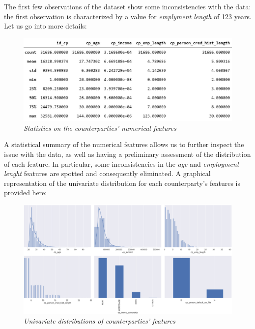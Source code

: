 \documentclass[a4paper,12pt]{article}
\begin{document}
    The first few observations of the dataset show some inconsistencies with the data: the first observation 
    is characterized by a value for \textit{emplyment length} of 123 years. Let us go into more details:

        \begin{figure}[H]
            \centerline{
                \includegraphics[width=\linewidth]{./images/cp_dataset_describe.jpg}
            }
            \caption{\textit{Statistics on the counterparties' numerical features}}
            \label{fig:cp_describe}
        \end{figure}

    A statistical summary of the numerical features allows us to further inspect the issue with the data, as well
    as having a preliminary assessment of the distribution of each feature. In particular, some inconsistencies 
    in the \textit{age} and \textit{employment lenght} features are spotted and consequently eliminated. 
    A graphical representation of the univariate distribution for each counterparty's features is provided here:

        \begin{figure}[H]
            \centerline{
                \includegraphics[width=\linewidth]{./images/cp_univariate.png}
            }
            \caption{\textit{Univariate distributions of counterparties' features}}
            \label{fig:cp_univariate}
        \end{figure}
\end{document}
